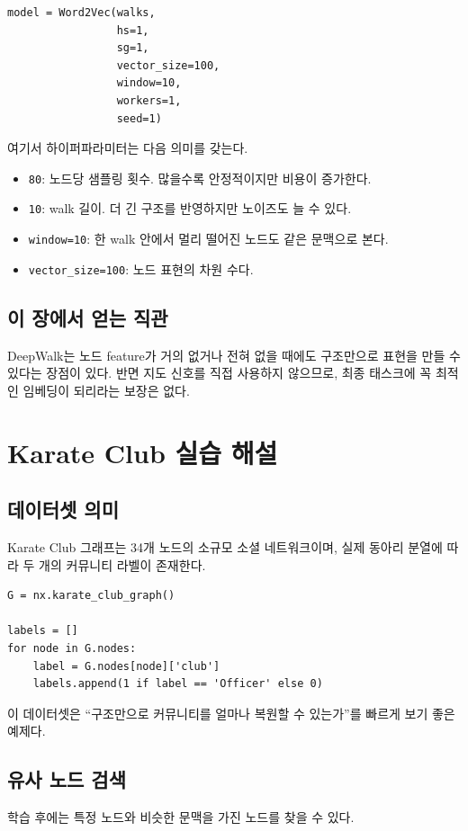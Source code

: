 \documentclass[11pt,a4paper]{article}
\begin{document}
\begin{lstlisting}
model = Word2Vec(walks,
                 hs=1,
                 sg=1,
                 vector_size=100,
                 window=10,
                 workers=1,
                 seed=1)
\end{lstlisting}

여기서 하이퍼파라미터는 다음 의미를 갖는다.
\begin{itemize}[leftmargin=*]
  \item \texttt{80}: 노드당 샘플링 횟수. 많을수록 안정적이지만 비용이 증가한다.
  \item \texttt{10}: walk 길이. 더 긴 구조를 반영하지만 노이즈도 늘 수 있다.
  \item \texttt{window=10}: 한 walk 안에서 멀리 떨어진 노드도 같은 문맥으로 본다.
  \item \texttt{vector\_size=100}: 노드 표현의 차원 수다.
\end{itemize}

\subsection{이 장에서 얻는 직관}
DeepWalk는 노드 feature가 거의 없거나 전혀 없을 때에도 구조만으로 표현을 만들 수 있다는 장점이 있다. 반면 지도 신호를 직접 사용하지 않으므로, 최종 태스크에 꼭 최적인 임베딩이 되리라는 보장은 없다.

\section{Karate Club 실습 해설}

\subsection{데이터셋 의미}
Karate Club 그래프는 34개 노드의 소규모 소셜 네트워크이며, 실제 동아리 분열에 따라 두 개의 커뮤니티 라벨이 존재한다.

\begin{lstlisting}
G = nx.karate_club_graph()

labels = []
for node in G.nodes:
    label = G.nodes[node]['club']
    labels.append(1 if label == 'Officer' else 0)
\end{lstlisting}

이 데이터셋은 ``구조만으로 커뮤니티를 얼마나 복원할 수 있는가''를 빠르게 보기 좋은 예제다.

\subsection{유사 노드 검색}
학습 후에는 특정 노드와 비슷한 문맥을 가진 노드를 찾을 수 있다.
\end{document}
